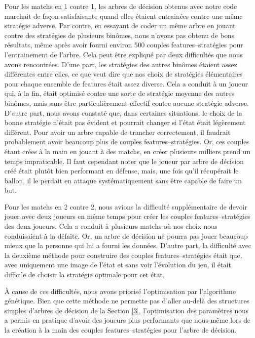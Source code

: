 \documentclass[a4paper,12pt]{article}
\begin{document}
Pour les matchs en 1 contre 1, les arbres de décision obtenus avec notre code marchait de façon satisfaisante quand elles étaient entrainées contre une même stratégie adverse. Par contre, en essayant de coder un même arbre en jouant contre des stratégies de plusieurs binômes, nous n'avons pas obtenu de bons résultats, même après avoir fourni environ 500 couples features--stratégies pour l'entrainement de l'arbre. Cela peut être expliqué par deux difficultés que nous avons rencontrées. D'une part, les stratégies des autres binômes étaient assez différentes entre elles, ce que veut dire que nos choix de stratégies élémentaires pour chaque ensemble de features était assez diverse. Cela a conduit à un joueur qui, à la fin, était optimisé contre une sorte de \og stratégie moyenne \fg{} des autres binômes, mais sans être particulièrement effectif contre aucune stratégie adverse. D'autre part, nous avons constaté que, dans certaines situations, le choix de la bonne stratégie n'était pas évident et pourrait changer si l'état était légèrement différent. Pour avoir un arbre capable de trancher correctement, il faudrait probablement avoir beaucoup plus de couples features--stratégies. Or, ces couples étant crées à la main en jouant à des matchs, en créer plusieurs milliers prend un temps impraticable. Il faut cependant noter que le joueur par arbre de décision créé était plutôt bien performant en défense, mais, une fois qu'il récupérait le ballon, il le perdait en attaque systématiquement sans être capable de faire un but.

Pour les matchs en 2 contre 2, nous avions la difficulté supplémentaire de devoir jouer avec deux joueurs en même temps pour créer les couples features--stratégies des deux joueurs. Cela a conduit à plusieurs matchs où nos choix nous conduisaient à la défaite. Or, un arbre de décision ne pourra pas jouer beaucoup mieux que la personne qui lui a fourni les données. D'autre part, la difficulté avec la deuxième méthode pour construire des couples features--stratégies était que, avec uniquement une image de l'état et sans voir l'évolution du jeu, il était difficile de choisir la stratégie optimale pour cet état.

À cause de ces difficultés, nous avons priorisé l'optimisation par l'algorithme génétique. Bien que cette méthode ne permette pas d'aller au-delà des structures simples d'arbres de décision de la Section \ref{3}, l'optimisation des paramètres nous a permis en pratique d'avoir des joueurs plus performants que nous-même lors de la création à la main des couples features--stratégies pour l'arbre de décision.
\end{document}
